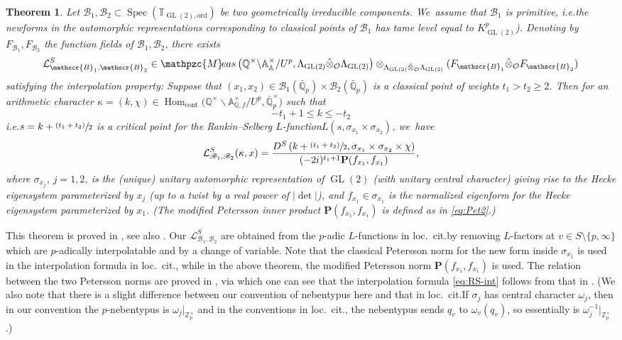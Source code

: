 \documentclass[10pt]{amsart}
\newcommand{\ie}{i.e.}
\newcommand{\loccit}{loc.\ cit.}
\newcommand{\psfrac}[2]{\sfrac{(#1)}{#2}}
\newcommand{\Lfunction}{$L$\nobreakdash-func\-tion\xspace}
\newcommand{\Lfunctions}{$L$\nobreakdash-func\-tions\xspace}
\theoremstyle{plain}
\newtheorem{thm}{Theorem}[subsection]
\theoremstyle{remark}
\newcommand{\bA}{\mathbb{A}}
\newcommand{\bQ}{\mathbb{Q}}
\newcommand{\bT}{\mathbb{T}}
\newcommand{\bZ}{\mathbb{Z}}
\newcommand{\cL}{\mathcal{L}}
\newcommand{\cO}{\mathcal{O}}
\newcommand{\sB}{\mathscr{B}}
\newcommand{\bfP}{\mathbf{P}}
\DeclareMathOperator{\GL}{GL}
\newcommand{\Meas}{\mathpzc{M}\mkern-2mu eas}
\newcommand{\cont}{\mathrm{cont}}
\newcommand{\ord}{\mathrm{ord}}
\DeclareMathOperator{\Hom}{Hom}
\DeclareMathOperator{\Spec}{Spec}
\begin{document}
\begin{thm}\label{thm:Rankin}
Let $\sB_1,\sB_2\subset \Spec(\bT_{\GL(2),\ord})$ be two geometrically irreducible components. We~assume that $\sB_1$ is {\it primitive}, \ie the newforms in the automorphic representations corresponding to classical points of $\sB_1$ has tame level equal to $K^p_{\GL(2)}$). Denoting by $F_{\sB_1},F_{\sB_2}$ the function fields of $\sB_1,\sB_2$, there exists
\[
\cL^S_{\sB_1,\sB_2}\in \Meas\left(\bQ^\times\backslash\bA^\times_\bA/U^p,\Lambda_{\GL(2)}\hat{\otimes}_\cO\Lambda_{\GL(2)}\right)\otimes_{\Lambda_{\GL(2)}\hat{\otimes}_\cO\Lambda_{\GL(2)}} (F_{\sB_1}\hat{\otimes}_\cO F_{\sB_2})
\]
satisfying the interpolation property: Suppose that $(x_1,x_2)\in \sB_1(\bar{\bQ}_p)\times\sB_2(\bar{\bQ}_p)$ is a classical point of weights $t_1> t_2\geq 2$. Then for an arithmetic character $\kappa=(k,\chi)\in \Hom_\cont\bigl(\bQ^\times\backslash\bA^\times_{\bQ,f}/U^p,\bar{\bQ}^\times_p\bigr)$ such that
\[
-t_1+1\leq k\leq -t_2
\]
\ie $s=k+\psfrac{t_1+t_2}{2}$ is a critical point for the Rankin--Selberg \Lfunction \hbox{$L(s,\sigma_{x_1}\times\sigma_{x_2})$}, we~have
\begin{align}
\label{eq:RS-int} \cL^S_{\sB_1,\sB_2}(\kappa,x)=\frac{D^S\left(k+\psfrac{t_1+t_2}{2},\sigma_{x_1}\times\sigma_{x_2}\times\chi\right)}{ (-2i)^{t_1+1}\bfP(f_{x_1},f_{x_1})},
\end{align}
where $\sigma_{x_j}$, $j=1,2$, is the (unique) unitary automorphic representation of $\GL(2)$ (with unitary central character) giving rise to the Hecke eigensystem parameterized by $x_j$ (up to a twist by a real power of $|\det|$), and $f_{x_1}\in\sigma_{x_1}$ is the normalized eigenform for the Hecke eigensystem parameterized by $x_1$. (The modified Petersson inner product $\bfP(f_{x_1},f_{x_1})$ is defined as in \eqref{eq:Pet2}.)
\end{thm}

This theorem is proved in \cite[Th.\,5.1d]{Hi88}, see also \cite[Th.\,A]{Chen-Hsieh}. Our $\cL^S_{\sB_1,\sB_2}$ are obtained from the $p$-adic \Lfunctions in \loccit by removing $L$-factors at $v\in S\setminus\{p,\infty\}$ which are $p$-adically interpolatable and by a change of variable. Note that the classical Petersson norm for the new form inside $\sigma_{x_1}$ is used in the interpolation formula in \loccit, while in the above theorem, the modified Petersson norm $\bfP(f_{x_1},f_{x_1})$ is used. The relation between the two Petersson norms are proved in \cite[Lem.\,3.6]{HsiehTriple}, via which one can see that the interpolation formula \eqref{eq:RS-int} follows from that in \cite{Hi88,Chen-Hsieh}. (We also note that there is a slight difference between our convention of nebentypus here and that in \loccit If $\sigma_j$ has central character $\omega_j$, then in our convention the $p$-nebentypus is $\omega_j|_{\bZ^\times_p}$ and in the conventions in \loccit, the nebentypus sends $q_v$ to $\omega_v(q_v)$, so essentially is $\omega^{-1}_j|_{\bZ^\times_p}$.)
\end{document}
